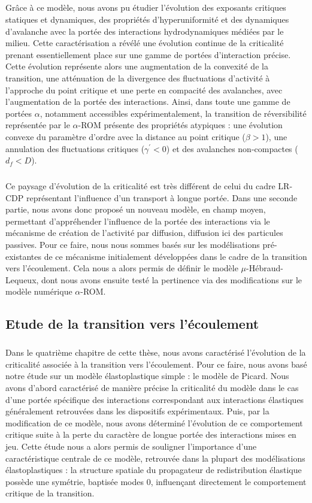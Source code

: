 \subparagraph{}Grâce à ce modèle, nous avons pu étudier l'évolution des exposants critiques statiques et dynamiques, des propriétés d'hyperuniformité et des dynamiques d'avalanche avec la portée des interactions hydrodynamiques médiées par le milieu. Cette caractérisation a révélé une évolution continue de la criticalité prenant essentiellement place sur une gamme de portées d'interaction précise. Cette évolution représente alors une augmentation de la convexité de la transition, une atténuation de la divergence des fluctuations d'activité à l'approche du point critique et une perte en compacité des avalanches, avec  l'augmentation de la portée des interactions. Ainsi, dans toute une gamme de portées $\alpha$, notamment accessibles expérimentalement, la transition de réversibilité représentée par le $\alpha$-ROM présente des propriétés atypiques : une évolution convexe du paramètre d'ordre avec la distance au point critique ($\beta > 1$), une annulation des fluctuations critiques ($\gamma^\prime < 0$) et des avalanches non-compactes ($d_f < D$).

\subparagraph{}Ce paysage d'évolution de la criticalité est très différent de celui du cadre LR-CDP représentant l'influence d'un transport à longue portée. Dans une seconde partie, nous avons donc proposé un nouveau modèle, en champ moyen, permettant d'appréhender l'influence de la portée des interactions via le mécanisme de création de l'activité par diffusion, diffusion ici des particules passives. Pour ce faire, nous nous sommes basés sur les modélisations pré-existantes de ce mécanisme initialement développées dans le cadre de la transition vers l'écoulement. Cela nous a alors permis de définir le modèle $\mu$-Hébraud-Lequeux, dont nous avons ensuite testé la pertinence via des modifications sur le modèle numérique $\alpha$-ROM.

\subsection*{Etude de la transition vers l'écoulement}

\subparagraph{}Dans le quatrième chapitre de cette thèse, nous avons caractérisé l'évolution de la criticalité associée à la transition vers l'écoulement. Pour ce faire, nous avons basé notre étude sur un modèle élastoplastique simple : le modèle de Picard. Nous avons d'abord caractérisé de manière précise la criticalité du modèle dans le cas d'une portée spécifique des interactions correspondant aux interactions élastiques généralement retrouvées dans les dispositifs expérimentaux. Puis, par la modification de ce modèle, nous avons déterminé l'évolution de ce comportement critique suite à la perte du caractère de longue portée des interactions mises en jeu. Cette étude nous a alors permis de souligner l'importance d'une caractéristique centrale de ce modèle, retrouvée dans la plupart des modélisations élastoplastiques : la structure spatiale du propagateur de redistribution élastique possède une symétrie, baptisée modes 0, influençant directement le comportement critique de la transition. 

